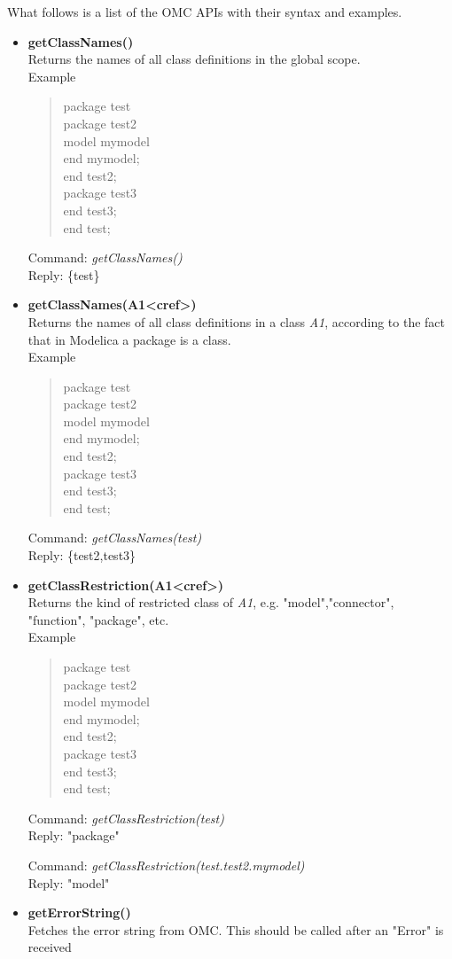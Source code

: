 \documentclass[11pt,a4paper,oneside,english]{book}
\newenvironment{modelicaExamples}{\begin{itemize}}{\end{itemize}}
\newcommand{\api}[2]{\item \textbf{#1} \\ #2}
\newcommand{\tab}{\hspace{2em}}
\newcommand{\command}[1]{Command: \textit{#1}\\}
\newcommand{\reply}[1]{Reply: #1}
\newcommand{\functionex}[2]{\begin{singlespace} \command{#1} \reply{#2} \end{singlespace}}
\newcommand{\examples}{Example}
\newenvironment{mocode}{\begin{verse}\begin{singlespace}\begin{scriptsize}\ttfamily}{\end{scriptsize}\end{singlespace}\end{verse}}
\begin{document}
What follows is a list of the OMC APIs with their syntax and examples.

 	\begin{modelicaExamples}
		\api{getClassNames()}{Returns the names of all class definitions in the global scope.\\ \examples{} 
			\begin{mocode}
				package test\\
			    \tab package test2\\
					\tab\tab model mymodel\\
					\tab\tab end mymodel;\\
				\tab end test2;\\
				\tab package test3\\
				\tab end test3;\\
				end test;\\ 
			\end{mocode} 

			\functionex{getClassNames()} 
			{\{test\}}

		}
		\api{getClassNames(A1<cref>)}{Returns the names of all class definitions in a class \textit{A1}, according to the fact that in Modelica a package is a class.\\ \examples
			\begin{mocode}
				package test\\
				\tab package test2\\
					\tab\tab model mymodel\\
					\tab\tab end mymodel;\\
				\tab end test2;\\
				\tab package test3\\
				\tab end test3;\\
				end test;\\
			\end{mocode} 

			\functionex{getClassNames(test)}
			{\{test2,test3\}}

		}
		
		\api{getClassRestriction(A1<cref>)}{Returns the kind of restricted class of \textit{A1}, e.g. "model","connector", "function", "package", etc.\\ \examples
			\begin{mocode}
				package test\\
				\tab package test2\\
					\tab\tab model mymodel\\
					\tab\tab end mymodel;\\
				\tab end test2;\\
				\tab package test3\\
				\tab end test3;\\
				end test;\\ 
			\end{mocode} 
			\functionex{getClassRestriction(test)}
			{"package"}
			\functionex{getClassRestriction(test.test2.mymodel)}
			{"model"}
		}
		\api{getErrorString()}{Fetches the error string from OMC. This should be called after an "Error" is received}
		

\end{modelicaExamples}
\end{document}
